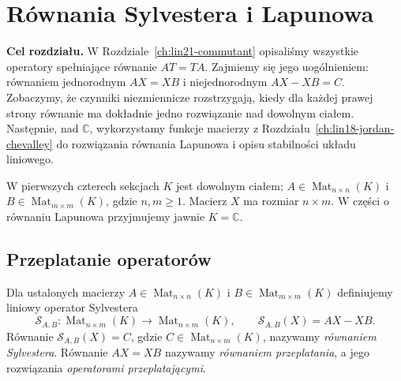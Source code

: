\chapter{Równania Sylvestera i Lapunowa}
\label{ch:lin22-sylvester}

\noindent\textbf{Cel rozdziału.}
W Rozdziale~\ref{ch:lin21-commutant}
opisaliśmy wszystkie operatory spełniające
równanie \(AT=TA\).
Zajmiemy się jego uogólnieniem:
równaniem jednorodnym \(AX=XB\)
i niejednorodnym \(AX-XB=C\).
Zobaczymy, że czynniki niezmiennicze
rozstrzygają, kiedy dla każdej prawej strony
równanie ma dokładnie jedno rozwiązanie
nad dowolnym ciałem.
Następnie, nad \(\mathbb C\), wykorzystamy
funkcje macierzy z
Rozdziału~\ref{ch:lin18-jordan-chevalley}
do rozwiązania równania Lapunowa
i opisu stabilności układu liniowego.

W pierwszych czterech sekcjach
\(K\) jest dowolnym ciałem;
\(A\in\operatorname{Mat}_{n\times n}(K)\)
i \(B\in\operatorname{Mat}_{m\times m}(K)\),
gdzie \(n,m\ge1\).
Macierz \(X\) ma rozmiar \(n\times m\).
W części o równaniu Lapunowa
przyjmujemy jawnie \(K=\mathbb C\).

\section{Przeplatanie operatorów}
\label{sec:lin22-intertwine}

\begin{definicja}
\label{def:lin22-sylvester}
Dla ustalonych macierzy
\(A\in\operatorname{Mat}_{n\times n}(K)\)
i \(B\in\operatorname{Mat}_{m\times m}(K)\)
definiujemy liniowy operator Sylvestera
\[
 \mathcal S_{A,B}\colon
 \operatorname{Mat}_{n\times m}(K)
 \longrightarrow\operatorname{Mat}_{n\times m}(K),
 \qquad \mathcal S_{A,B}(X)=AX-XB.
\]
Równanie
\(\mathcal S_{A,B}(X)=C\),
gdzie \(C\in\operatorname{Mat}_{n\times m}(K)\),
nazywamy \emph{równaniem Sylvestera}.
Równanie \(AX=XB\) nazywamy
\emph{równaniem przeplatania},
a jego rozwiązania
\emph{operatorami przeplatającymi}.
\end{definicja}

